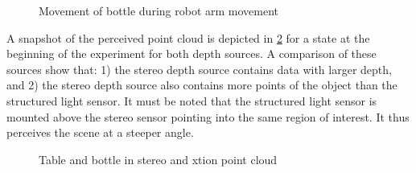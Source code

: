 \begin{figure}
\centering
{}
\caption{Movement of bottle during robot arm movement}
\label{fig:bottle_movement}
\end{figure}

A snapshot of the perceived point cloud is depicted in \cref{fig:bottle_point_cloud} for a state at the beginning of the experiment for both depth sources. A comparison of these sources show that: 1) the stereo depth source contains data with larger depth, and 2) the stereo depth source also contains more points of the object than the structured light sensor. It must be noted that the structured light sensor is mounted above the stereo sensor pointing into the same region of interest. It thus perceives the scene at a steeper angle.

\begin{figure}
\centering
{}
\hspace{1cm}
\caption{Table and bottle in stereo and xtion point cloud}
\label{fig:bottle_point_cloud}
\end{figure}

